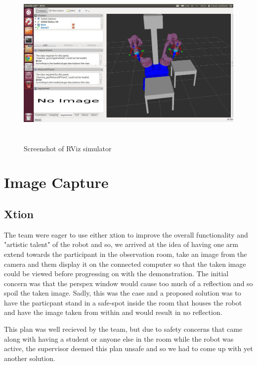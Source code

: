 \documentclass{l3proj}
\begin{document}
\begin{figure}[h!]
\centering
\includegraphics[width = 15cm, height = 8.36cm]{sim}
\caption{Screenshot of RViz simulator}
\label{fig:rviz}
\end{figure}

\pagebreak
\section{Image Capture}
\label{sec:imcap}
\subsection{Xtion}
The team were eager to use either \gls{xtion} to improve the overall functionality and "artistic talent" of the robot and so, we arrived at the idea of having one arm extend towards the participant in the observation room, take an image from the camera and them display it on the connected computer so that the taken image could be viewed before progressing on with the demonstration. The initial concern was that the perspex window would cause too much of a reflection and so spoil the taken image. Sadly, this was the case and a proposed solution was to have the particpant stand in a safe-spot inside the room that houses the robot and have the image taken from within and would result in no reflection.

This plan was well recieved by the team, but due to safety concerns that came along with having a student or anyone else in the room while the robot was active, the supervisor deemed this plan unsafe and so we had to come up with yet another solution.
\end{document}
